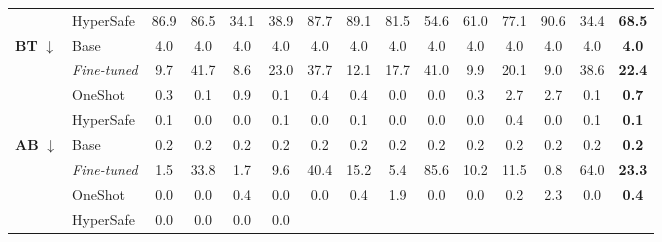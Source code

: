 \begin{table}[!t]
{\begin{tabular}{@{}l l@{\hspace{6pt}} cccc cccc cccc @{\hspace{6pt}} >{\bfseries}c@{}}
 & HyperSafe           & 86.9 & \textcolor{wingreen}{86.5} & \textcolor{wingreen}{34.1} & \textcolor{wingreen}{38.9}
                       & \textcolor{wingreen}{87.7} & \textcolor{wingreen}{89.1} & \textcolor{wingreen}{81.5} & \textcolor{wingreen}{54.6}
                       & 61.0 & \textcolor{wingreen}{77.1} & 90.6 & \textcolor{wingreen}{34.4} & \textcolor{wingreen}{68.5} \\
\cmidrule{1-15}
\multirow{4}{*}{\textbf{BT} $\downarrow$}
 & Base                & 4.0 & 4.0 & 4.0 & 4.0 & 4.0 & 4.0 & 4.0 & 4.0 & 4.0 & 4.0 & 4.0 & 4.0 & 4.0 \\
 & \cellcolor{mutegray}\textit{Fine-tuned}
   & \cellcolor{mutegray}9.7 & \cellcolor{mutegray}41.7 & \cellcolor{mutegray}8.6 & \cellcolor{mutegray}23.0
   & \cellcolor{mutegray}37.7 & \cellcolor{mutegray}12.1 & \cellcolor{mutegray}17.7 & \cellcolor{mutegray}41.0
   & \cellcolor{mutegray}9.9 & \cellcolor{mutegray}20.1 & \cellcolor{mutegray}9.0 & \cellcolor{mutegray}38.6 & \cellcolor{mutegray}22.4 \\
 & OneShot             & 0.3 & 0.1 & 0.9 & 0.1 & 0.4 & 0.4 & 0.0 & 0.0 & 0.3 & 2.7 & 2.7 & 0.1 & 0.7 \\
 & HyperSafe           & \textcolor{wingreen}{0.1} & \textcolor{wingreen}{0.0} & \textcolor{wingreen}{0.0} & \textcolor{wingreen}{0.1}
                       & \textcolor{wingreen}{0.0} & \textcolor{wingreen}{0.1} & \textcolor{wingreen}{0.0} & \textcolor{wingreen}{0.0}
                       & \textcolor{wingreen}{0.0} & \textcolor{wingreen}{0.4} & \textcolor{wingreen}{0.0} & \textcolor{wingreen}{0.1} & \textcolor{wingreen}{0.1} \\
\cmidrule{1-15}
\multirow{4}{*}{\textbf{AB} $\downarrow$}
 & Base                & 0.2 & 0.2 & 0.2 & 0.2 & 0.2 & 0.2 & 0.2 & 0.2 & 0.2 & 0.2 & 0.2 & 0.2 & 0.2 \\
 & \cellcolor{mutegray}\textit{Fine-tuned}
   & \cellcolor{mutegray}1.5 & \cellcolor{mutegray}33.8 & \cellcolor{mutegray}1.7 & \cellcolor{mutegray}9.6
   & \cellcolor{mutegray}40.4 & \cellcolor{mutegray}15.2 & \cellcolor{mutegray}5.4 & \cellcolor{mutegray}85.6
   & \cellcolor{mutegray}10.2 & \cellcolor{mutegray}11.5 & \cellcolor{mutegray}0.8 & \cellcolor{mutegray}64.0 & \cellcolor{mutegray}23.3 \\
 & OneShot             & 0.0 & 0.0 & 0.4 & 0.0 & 0.0 & 0.4 & 1.9 & 0.0 & 0.0 & 0.2 & 2.3 & 0.0 & 0.4 \\
 & HyperSafe           & \textcolor{wingreen}{0.0} & \textcolor{wingreen}{0.0} & \textcolor{wingreen}{0.0} & \textcolor{wingreen}{0.0}

\end{tabular}}
\end{table}
